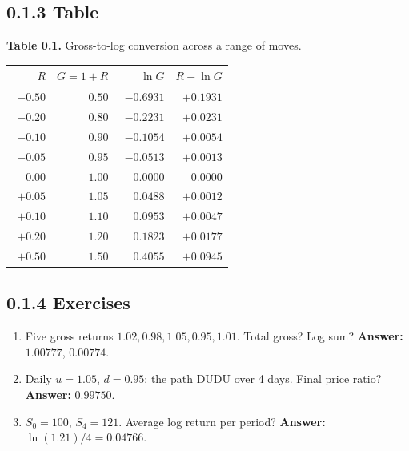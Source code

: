 \documentclass[
  10pt,
  twoside]{book}
\newcounter{none} %
\providecommand{\tightlist}{%
  \setlength{\itemsep}{0pt}\setlength{\parskip}{0pt}}
\begin{document}
\subsection{0.1.3 Table}\label{table}

\textbf{Table 0.1.} Gross-to-log conversion across a range of moves.

{\def\LTcaptype{none} %
\begin{table}[H]
\centering
\begin{tabular}{|r|r|r|r|}
\toprule
\(R\) & \(G = 1+R\) & \(\ln G\) & \(R - \ln G\) \\
\midrule



\(-0.50\) & \(0.50\) & \(-0.6931\) & \(+0.1931\) \\
\(-0.20\) & \(0.80\) & \(-0.2231\) & \(+0.0231\) \\
\(-0.10\) & \(0.90\) & \(-0.1054\) & \(+0.0054\) \\
\(-0.05\) & \(0.95\) & \(-0.0513\) & \(+0.0013\) \\
\(\phantom{+}0.00\) & \(1.00\) & \(\phantom{+}0.0000\) &
\(\phantom{+}0.0000\) \\
\(+0.05\) & \(1.05\) & \(\phantom{+}0.0488\) & \(+0.0012\) \\
\(+0.10\) & \(1.10\) & \(\phantom{+}0.0953\) & \(+0.0047\) \\
\(+0.20\) & \(1.20\) & \(\phantom{+}0.1823\) & \(+0.0177\) \\
\(+0.50\) & \(1.50\) & \(\phantom{+}0.4055\) & \(+0.0945\) \\
\bottomrule
\end{tabular}
\end{table}
}

\subsection{0.1.4 Exercises}\label{exercises}

\begin{enumerate}
\def\labelenumi{\arabic{enumi}.}
\tightlist
\item
  Five gross returns \(1.02, 0.98, 1.05, 0.95, 1.01\). Total gross? Log
  sum? \textbf{Answer:} \(1.00777\), \(0.00774\).
\item
  Daily \(u = 1.05\), \(d = 0.95\); the path DUDU over 4 days. Final
  price ratio? \textbf{Answer:} \(0.99750\).
\item
  \(S_0 = 100\), \(S_4 = 121\). Average log return per period?
  \textbf{Answer:} \(\ln(1.21)/4 = 0.04766\).
\end{enumerate}
\end{document}
